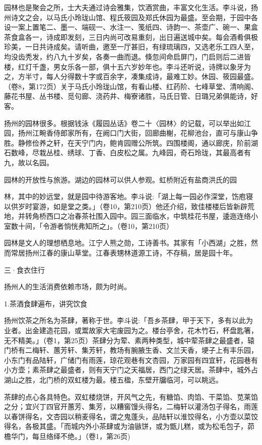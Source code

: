 园林也是聚会之所，士大夫通过诗会雅集，饮酒赏曲，丰富文化生活。李斗说，扬州诗文之会，以马氏小玲珑山馆、程氏筱园及郑氏休园为最盛。至会期，于园中各设一案上置笔二、墨一、端砚一、水注一、笺纸四、诗韵一、茶壶广、碗一、果盒茶食盒各一，诗成即发刻，三日内尚可改易重刻，出日遍送城中矣。每会酒肴俱极珍美，一日共诗成矣。请听曲，邀至一厅甚旧，有绿琉璃四，又选老乐工四人至，均没齿秃发，约八九十岁矣，各奏一曲而退。倏忽间命启屏门，门启则后二进皆楼，红灯千盏，男女乐各一部，俱十五六岁妙年也。李斗还听说，诗牌以象牙为之，方半寸，每人分得数十字或百余字，凑集成诗，最难工妙。休园、筱园最盛。（卷8，第172页）关于马氏小玲珑山馆，有看山楼、红药阶、七峰草堂、清响阁、藤花书屋、丛书楼、觅句廊、浇药井、梅寮诸胜，马氏日管、日璐兄弟俱能诗，好客。

扬州的园林很多。根据钱泳《履园丛话》卷二十〈园林〉的记载，可以举出如江园，扬州江畹香侍郎家所有，在阙口门大街，回廊曲榭，花柳池台，直可与康山争胜。静修俭养之轩，在天宁门内，鲍肯园赠公所筑。四围楼阁，通以廊庑，阶前湖石数峰，尽栽丛桂、绣球、丁香、白皮松之属。九峰园，奇石玲珑，其最高者有九，故以名园。

园林的开放性与旅游。湖边的园林可以供人参观。虹桥附近有盐商洪氏的园


\noindent 林，其中的妙远堂，就是园中待游客地。李斗说:「湖上每一园必作深堂，饬庖寝以供岁时宴游，如是堂之类。」（卷10，第210页）他还介绍，致佳楼楼后皆新辟荒地，并转角桥西口之冶春茶社围入园中。园三面临水，中筑桂花书屋，逶迤连络小室数十间，「令游者惝恍弗知所之」。（卷10，第210页）

园林是文人的理想栖息地。江宁人熊之勋，工诗善书。其家有「小西湖」之胜，然而常居扬州江春的康山草堂。江春表甥林道源工诗，不存稿，居是园十年。

三·食衣住行

扬州人的生活消费依赖市场，颇为时尚。

1.茶酒食肆遍布，讲究饮食


扬州饮茶之所名为茶肆，著称于世。李斗说:「吾乡茶肆，甲于天下，多有以此为业者。出金建造花园，或鬻故家大宅废园为之。楼台亭舍，花木竹石，杯盘匙箸，无不精美。」（卷1，第25页）茶肆分为荤、素两种类型，城中荤茶肆之最盛者，辕门桥有二梅轩、蕙芳轩、集芳轩，教场有腕腋生香、文兰天香，埂子上有丰乐园，小东门有品陆轩，广储门有雨莲，琼花观巷有文杏园，万家园有四宜轩，花园巷有小方壶；素茶肆之最盛者，则有天宁门之天福居，西门之绿天居。茶肆中，城外占湖山之胜，北门桥的双虹楼为最。楼五楹，东壁开牖临河，可以眺远。

茶肆的点心各具特色。双虹楼烧饼，开风气之先，有糖馅、肉馅、干菜馅、苋莱馅之分；宜兴丁四官开蕙芳、集芳，以糟窖馒头得名，二梅轩以灌汤包子得名，雨莲以春饼得名，文杏园以稍麦得名，谓之鬼蓬头，品陆轩以淮饺得名，小方壶以菜饺得名，各极其盛。「而城内外小茶肆或为油镞饼，或为甑儿糕，或为松毛包子，茆檐华门，每旦络绎不绝。」（卷1，第26页)

